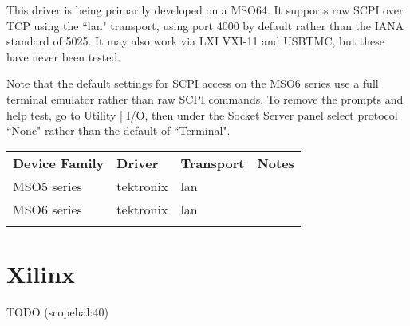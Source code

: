 This driver is being primarily developed on a MSO64. It supports raw SCPI over TCP using the ``lan" transport,
using port 4000 by default rather than the IANA standard of 5025. It may also work via LXI VXI-11 and USBTMC, but
these have never been tested.

Note that the default settings for SCPI access on the MSO6 series use a full terminal emulator rather than raw SCPI
commands. To remove the prompts and help test, go to Utility | I/O, then under the Socket Server panel select protocol
``None" rather than the default of ``Terminal".

\begin{tabularx}{16cm}{lllX}
\thickhline
\textbf{Device Family} & \textbf{Driver} & \textbf{Transport} & \textbf{Notes} \\
\thickhline
MSO5 series & tektronix & lan &  \\
\thickhline
MSO6 series & tektronix & lan &  \\
\thickhline
\end{tabularx}

\section{Xilinx}
TODO (scopehal:40)
